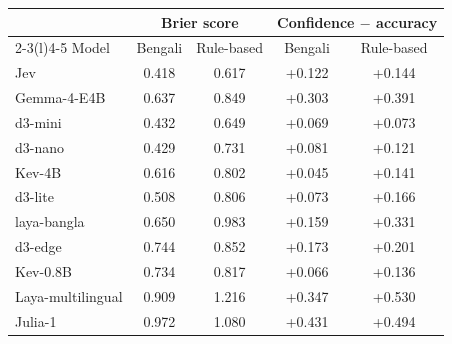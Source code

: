 \begin{tabular}{@{}lcccc@{}}\toprule
 & \multicolumn{2}{c}{Brier score} & \multicolumn{2}{c}{Confidence $-$ accuracy} \\\cmidrule(lr){2-3}\cmidrule(l){4-5}
Model & Bengali & Rule-based & Bengali & Rule-based \\\midrule
Jev & 0.418 & 0.617 & +0.122 & +0.144 \\
Gemma-4-E4B & 0.637 & 0.849 & +0.303 & +0.391 \\
d3-mini & 0.432 & 0.649 & +0.069 & +0.073 \\
d3-nano & 0.429 & 0.731 & +0.081 & +0.121 \\
Kev-4B & 0.616 & 0.802 & +0.045 & +0.141 \\
d3-lite & 0.508 & 0.806 & +0.073 & +0.166 \\
laya-bangla & 0.650 & 0.983 & +0.159 & +0.331 \\
d3-edge & 0.744 & 0.852 & +0.173 & +0.201 \\
Kev-0.8B & 0.734 & 0.817 & +0.066 & +0.136 \\
Laya-multilingual & 0.909 & 1.216 & +0.347 & +0.530 \\
Julia-1 & 0.972 & 1.080 & +0.431 & +0.494 \\
\bottomrule\end{tabular}
